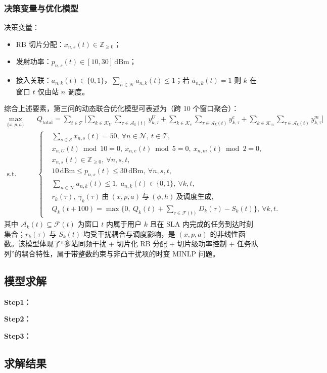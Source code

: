 \subsubsection{决策变量与优化模型}

决策变量：
\begin{itemize}
  \item RB 切片分配：$x_{n,s}(t)\in\mathbb{Z}_{\ge 0}$；
  \item 发射功率：$p_{n,s}(t)\in[10,30]\,\mathrm{dBm}$；
  \item 接入关联：$a_{n,k}(t)\in\{0,1\}$，$\sum\limits_{n\in\mathcal{N}}a_{n,k}(t)\le 1$；若 $a_{n,k}(t)=1$ 则 $k$ 在窗口 $t$ 仅由站 $n$ 调度。
\end{itemize}

综合上述要素，第三问的动态联合优化模型可表述为（跨 10 个窗口聚合）：
\begin{equation}
\begin{aligned}
\max_{\{x,p,a\}}\quad & Q_{\text{total}}=\sum_{t\in\mathcal{T}}\Bigg[\sum_{k\in\mathcal{K}_U}\sum_{\tau\in\mathcal{A}_k(t)} y^{U}_{k,\tau}+\sum_{k\in\mathcal{K}_e}\sum_{\tau\in\mathcal{A}_k(t)} y^{e}_{k,\tau}+\sum_{k\in\mathcal{K}_m}\sum_{\tau\in\mathcal{A}_k(t)} y^{m}_{k,\tau}\Bigg] \\
\text{s.t.}\quad & 
\left\{
\begin{aligned}
& \sum_{s\in\mathcal{S}} x_{n,s}(t)=50,\ \forall n\in\mathcal{N},\ t\in\mathcal{T}, \\
& x_{n,U}(t)\bmod 10=0,\ x_{n,e}(t)\bmod 5=0,\ x_{n,m}(t)\bmod 2=0, \\
& x_{n,s}(t)\in\mathbb{Z}_{\ge 0},\ \forall n,s,t, \\
& 10\,\mathrm{dBm}\le p_{n,s}(t)\le 30\,\mathrm{dBm},\ \forall n,s,t, \\
& \sum_{n\in\mathcal{N}} a_{n,k}(t)\le 1,\ a_{n,k}(t)\in\{0,1\},\ \forall k,t, \\
& r_k(\tau),\ \gamma_k(\tau)\ \text{由}\ (x,p,a)\ \text{与}\ (\phi,h)\ \text{及调度生成}, \\
& Q_k(t+100)=\max\Big\{0,\ Q_k(t)+\sum_{\tau\in\mathcal{F}(t)} D_k(\tau)-S_k(t)\Big\},\ \forall k,t.
\end{aligned}
\right.
\end{aligned}
\end{equation}
其中 $\mathcal{A}_k(t)\subseteq\mathcal{F}(t)$ 为窗口 $t$ 内属于用户 $k$ 且在 SLA 内完成的任务到达时刻集合；$r_k(\tau)$ 与 $S_k(t)$ 均受干扰耦合与调度影响，是 $(x,p,a)$ 的非线性函数。该模型体现了“多站同频干扰 + 切片化 RB 分配 + 切片级功率控制 + 任务队列”的耦合特性，属于带整数约束与非凸干扰项的时变 MINLP 问题。

\subsection{模型求解}

\textbf{Step1：} 

\textbf{Step2：} 

\textbf{Step3：} 

\subsection{求解结果}